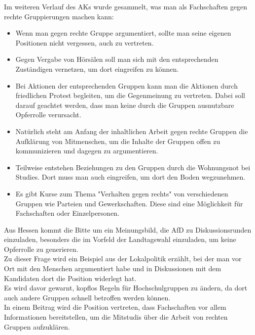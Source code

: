     Im weiteren Verlauf des AKs wurde gesammelt, was man als Fachschaften gegen rechte Gruppierungen machen kann:

    \begin{itemize}
      \item Wenn man gegen rechte Gruppe argumentiert, sollte man seine eigenen Positionen nicht vergessen, auch zu vertreten.
      \item Gegen Vergabe von Hörsälen soll man sich mit den entsprechenden Zuständigen vernetzen, um dort eingreifen zu können.
      \item Bei Aktionen der entsprechenden Gruppen kann man die Aktionen durch friedlichen Protest begleiten, um die Gegenmeinung zu vertreten. Dabei soll darauf geachtet werden, dass man keine durch die Gruppen ausnutzbare Opferrolle verursacht.
      \item Natürlich steht am Anfang der inhaltlichen Arbeit gegen rechte Gruppen die Aufklärung von Mitmenschen, um die Inhalte der Gruppen offen zu kommunizieren und dagegen zu argumentieren.
      \item Teilweise entstehen Beziehungen zu den Gruppen durch die Wohnungsnot bei Studies. Dort muss man auch eingreifen, um dort den Boden wegzunehmen.
      \item Es gibt Kurse zum Thema "Verhalten gegen rechts" von verschiedenen Gruppen wie Parteien und Gewerkschaften. Diese sind eine Möglichkeit für Fachschaften oder Einzelpersonen.
    \end{itemize}

    Aus Hessen kommt die Bitte um ein Meinungsbild, die AfD zu Diskussionsrunden einzuladen, besonders die im Vorfeld der Landtagswahl einzuladen, um keine Opferrolle zu generieren. \\

    Zu dieser Frage wird ein Beispiel aus der Lokalpolitik erzählt, bei der man vor Ort mit den Menschen argumentiert habe und in Diskussionen mit dem Kandidaten dort die Position widerlegt hat. \\

    Es wird davor gewarnt, kopflos Regeln für Hochschulgruppen zu ändern, da dort auch andere Gruppen schnell betroffen werden können. \\

    In einem Beitrag wird die Position vertreten, dass Fachschaften vor allem Informationen bereitstellen, um die Mitstudis über die Arbeit von rechten Gruppen aufzuklären. \\

